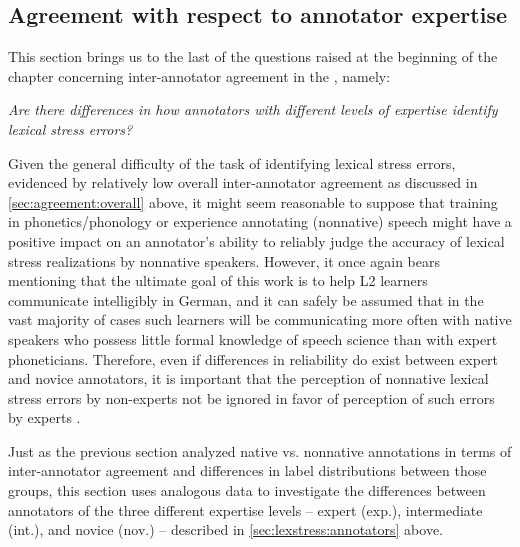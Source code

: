 		
		\subsection{Agreement with respect to annotator expertise}
		\label{sec:agreement:expert}
		
		
		
	This section brings us to the last of the questions raised at the beginning of the chapter concerning inter-annotator agreement in the , namely:
	
	\textit{Are there differences in how 
	annotators with different levels of expertise
	identify lexical stress errors?}
	
	Given the general difficulty of the task of identifying lexical stress errors, evidenced by relatively low overall inter-annotator agreement as discussed in \cref{sec:agreement:overall} above, it might seem reasonable to suppose that training in phonetics/phonology or experience annotating (nonnative) speech might have a positive impact on an annotator's ability to reliably judge the accuracy of lexical stress realizations by nonnative speakers. However, it once again bears mentioning that the ultimate goal of this work is to help L2 learners communicate intelligibly in German, and it can safely be assumed that in the vast majority of cases such learners will be communicating more often with native speakers who possess little formal knowledge of speech science than with expert phoneticians. Therefore, even if differences in reliability do exist between expert and novice annotators, it is important that the perception of nonnative lexical stress errors by non-experts not be ignored in favor of perception of such errors by experts . 
	

	
	Just as the previous section analyzed native vs. nonnative annotations in terms of inter-annotator agreement and differences in label distributions between those groups, this section uses analogous data to investigate the differences between annotators of the three different expertise levels -- expert (exp.), intermediate (int.), and novice (nov.) -- described in \cref{sec:lexstress:annotators} above.
	
